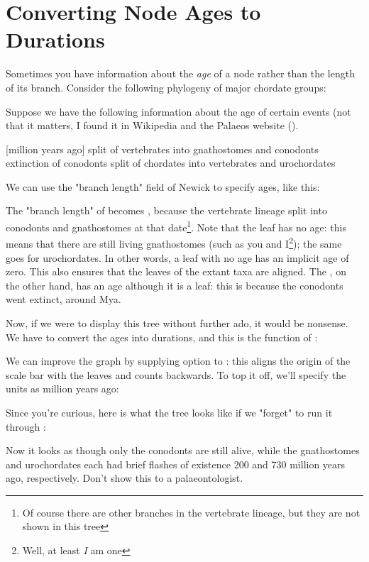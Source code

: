 
\section[sct_duration]{Converting Node Ages to Durations}

Sometimes you have information about the \emph{age} of a node rather than the
length of its branch. Consider the following phylogeny of major chordate groups:

\startalignment[center]
\stopalignment

Suppose we have the following information about the age of certain events (not
that it matters, I found it in Wikipedia and the Palaeos website ().

\smallskip

\starttabulate[|l|r|]
  [million years ago]\NC\NR
\HL
\NC split of vertebrates into gnathostomes and conodonts  \NC\NR
\NC extinction of conodonts  \NC\NR
\NC split of chordates into vertebrates and urochordates  \NC\NR
\stoptabulate

\smallskip

We can use the "branch length" field of Newick to specify ages, like
this:


The "branch length" of  becomes ,
because the vertebrate lineage split into conodonts and gnathostomes at that
date\footnote{Of course there are other branches in the vertebrate lineage, but
they are not shown in this tree}. Note that the  leaf has
no age: this means that there are still living gnathostomes (such as you and
I\footnote{Well, at least \emph{I} am one}); the same goes for urochordates.
In other words, a leaf with no age has an implicit age of zero. This also
ensures that the leaves of the extant taxa are aligned.  The ,
on the other hand, has an age although it is a leaf: this is because the
conodonts went extinct, around  Mya.

Now, if we were to display this tree without further ado, it would be nonsense.
We have to convert the ages into durations, and this is the function of
\duration{}:


We can improve the graph by supplying option  to
\display{}: this aligns the origin of the scale bar with the leaves and counts
backwards. To top it off, we'll specify the units as million years ago:



Since you're curious, here is what the  tree looks like if we
"forget" to run it through \duration:


Now it looks as though only the conodonts are still alive, while the
gnathostomes and urochordates each had brief flashes of existence 200 and 730
million years ago, respectively. Don't show this to a palaeontologist.



